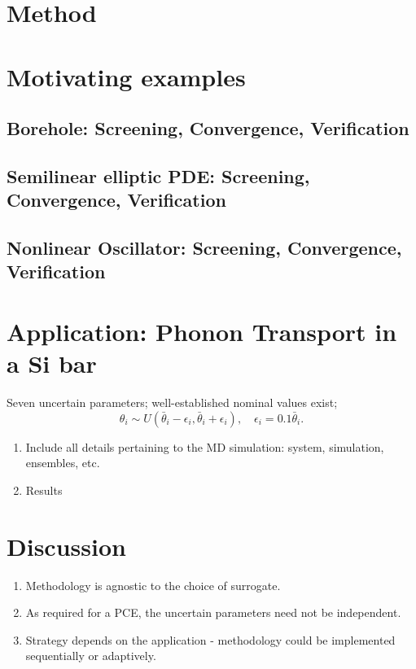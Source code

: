 \documentclass[letter,12pt]{article}
\begin{document}
\section{Method}

\section{Motivating examples}
\subsection{Borehole: Screening, Convergence, Verification}
\subsection{Semilinear elliptic PDE: Screening, Convergence, Verification}
\subsection{Nonlinear Oscillator: Screening, Convergence, Verification}

\section{Application: Phonon Transport in a Si bar}

Seven uncertain parameters; well-established nominal values exist;
\[
   \theta_i \sim U(\bar\theta_i - \epsilon_i, \bar\theta_i + \epsilon_i), 
   \quad \epsilon_i = 0.1 \bar\theta_i. 
\]
\begin{enumerate}
\item Include all details pertaining to the MD simulation: system, simulation, 
ensembles, etc. 
\item Results
\end{enumerate}

\section{Discussion}
\begin{enumerate}
\item Methodology is agnostic to the choice of surrogate.
\item As required for a PCE, the uncertain parameters need not be independent. 
\item Strategy depends on the application - methodology could be implemented 
sequentially or adaptively. 
\end{enumerate}
\end{document}
